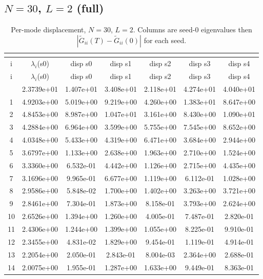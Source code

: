\subsection{$N=30$, $L=2$ (full)}
\begin{longtable}{c c c c c c c}
\caption{Per-mode displacement, $N=30$, $L=2$. Columns are seed-0 eigenvalues then $|\widetilde{G}_{ii}(T)-\widetilde{G}_{ii}(0)|$ for each seed.}\\
\label{tab:permode-N30-L2}\\
\toprule
i & $\lambda_i$(s0) & disp s0 & disp s1 & disp s2 & disp s3 & disp s4 \\
\midrule
\endfirsthead
\toprule
i & $\lambda_i$(s0) & disp s0 & disp s1 & disp s2 & disp s3 & disp s4 \\
\midrule
\endhead
\bottomrule
\endfoot
0 & 2.3739e+01 & 1.407e+01 & 3.408e+01 & 2.118e+01 & 4.274e+01 & 4.040e+01 \\
1 & 4.9203e+00 & 5.019e+00 & 9.219e+00 & 4.260e+00 & 1.383e+01 & 8.647e+00 \\
2 & 4.8453e+00 & 8.987e+00 & 1.047e+01 & 3.161e+00 & 8.430e+00 & 1.090e+01 \\
3 & 4.2884e+00 & 6.964e+00 & 3.599e+00 & 5.755e+00 & 7.545e+00 & 8.652e+00 \\
4 & 4.0348e+00 & 5.433e+00 & 4.319e+00 & 6.471e+00 & 3.684e+00 & 2.944e+00 \\
5 & 3.6797e+00 & 1.133e+00 & 2.638e+00 & 1.963e+00 & 2.710e+00 & 1.524e+00 \\
6 & 3.3360e+00 & 6.532e-01 & 4.442e+00 & 1.126e+00 & 2.715e+00 & 4.435e+00 \\
7 & 3.1696e+00 & 9.965e-01 & 6.677e+00 & 1.119e+00 & 6.112e-01 & 1.028e+00 \\
8 & 2.9586e+00 & 5.848e-02 & 1.700e+00 & 1.402e+00 & 3.263e+00 & 3.721e+00 \\
9 & 2.8461e+00 & 7.304e-01 & 1.873e+00 & 8.158e-01 & 3.793e+00 & 2.624e+00 \\
10 & 2.6526e+00 & 1.394e+00 & 1.260e+00 & 4.005e-01 & 7.487e-01 & 2.820e-01 \\
11 & 2.4306e+00 & 1.244e+00 & 1.399e+00 & 1.055e+00 & 8.225e-01 & 9.910e-01 \\
12 & 2.3455e+00 & 4.831e-02 & 1.829e+00 & 9.454e-01 & 1.119e-01 & 4.914e-01 \\
13 & 2.2054e+00 & 2.050e-01 & 2.843e-01 & 8.004e-03 & 2.364e+00 & 2.688e-01 \\
14 & 2.0075e+00 & 1.955e-01 & 1.287e+00 & 1.633e+00 & 9.449e-01 & 8.363e-01 \\

\end{longtable}
